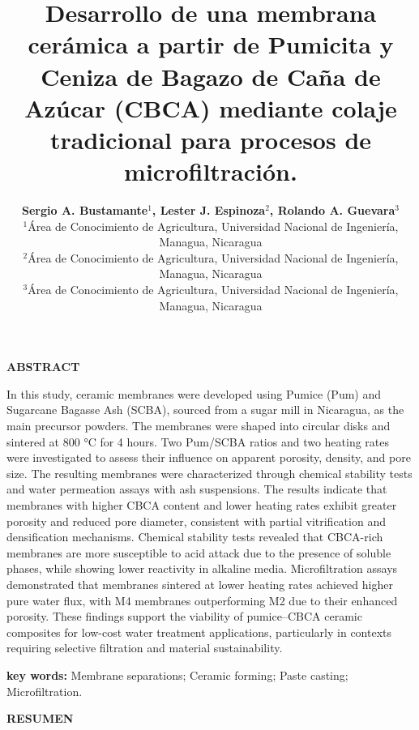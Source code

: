 \documentclass{article}
\title{\textbf{Desarrollo de una membrana cerámica a partir de Pumicita y Ceniza de Bagazo de Caña de Azúcar (CBCA) mediante colaje tradicional para procesos de microfiltración.}}
\author{\textbf{Sergio A. Bustamante$^1$, Lester J. Espinoza$^2$, Rolando A. Guevara$^3$}\\ $^1$Área de Conocimiento de Agricultura, Universidad Nacional de Ingeniería, Managua, Nicaragua\\ $^2$Área de Conocimiento de Agricultura, Universidad Nacional de Ingeniería, Managua, Nicaragua\\ $^3$Área de Conocimiento de Agricultura, Universidad Nacional de Ingeniería, Managua, Nicaragua}
\date{}
\begin{document}
\maketitle

\begin{center}
    \textbf{\large{ABSTRACT} }
\end{center}

\justifying
In this study, ceramic membranes were developed using Pumice (Pum) 
and Sugarcane Bagasse Ash (SCBA), sourced from a sugar mill in 
Nicaragua, as the main precursor powders. The membranes were shaped 
into circular disks and sintered at 800 °C for 4 hours. 
Two Pum/SCBA ratios and two heating rates were investigated to assess 
their influence on apparent porosity, density, and pore size. 
The resulting membranes were characterized through chemical stability 
tests and water permeation assays with ash suspensions. 
The results indicate that membranes with higher CBCA content and lower 
heating rates exhibit greater porosity and reduced pore diameter, 
consistent with partial vitrification and densification mechanisms. 
Chemical stability tests revealed that CBCA-rich membranes are more 
susceptible to acid attack due to the presence of soluble phases, 
while showing lower reactivity in alkaline media. 
Microfiltration assays demonstrated that membranes sintered at lower 
heating rates achieved higher pure water flux, with M4 membranes 
outperforming M2 due to their enhanced porosity. These findings support 
the viability of pumice–CBCA ceramic composites for low-cost water 
treatment applications, particularly in contexts requiring selective 
filtration and material sustainability.
\hfill \break

\textbf{key words:} Membrane separations; Ceramic forming; Paste casting; Microfiltration. 

\begin{center}
    \textbf{\large{RESUMEN} }
\end{center}
\end{document}
